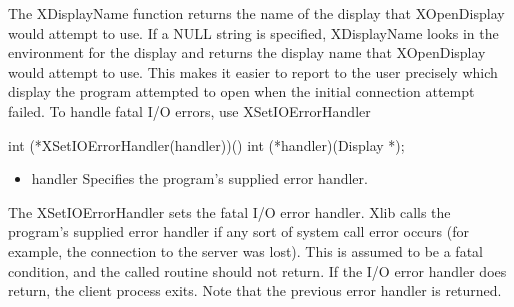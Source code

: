 \documentclass{report}
\begin{document}
\begin{itemize}
\begin{itemize}
            \end{itemize}
            The XDisplayName function returns the name of the display that XOpenDisplay would attempt to use. If a NULL string is specified, XDisplayName looks in the environment for the display and returns the display name that XOpenDisplay would attempt to use. This makes it easier to report to the user precisely which display the program attempted to open when the initial connection attempt failed.
            \bigbreak \noindent 
            To handle fatal I/O errors, use XSetIOErrorHandler
            \bigbreak \noindent 
            \begin{cppcode}
                int (*XSetIOErrorHandler(handler))()
                    int (*handler)(Display *);
            \end{cppcode}
            \bigbreak \noindent
            \begin{itemize}
                \item handler Specifies the program’s supplied error handler.
            \end{itemize}
            The XSetIOErrorHandler sets the fatal I/O error handler. Xlib calls the program’s supplied error handler if any sort of system call error occurs (for example, the connection to the server was lost). This is assumed to be a fatal condition, and the called routine should not return. If the I/O error handler does return, the client process exits. Note that the previous error handler is returned.


    \end{itemize}
\end{document}
